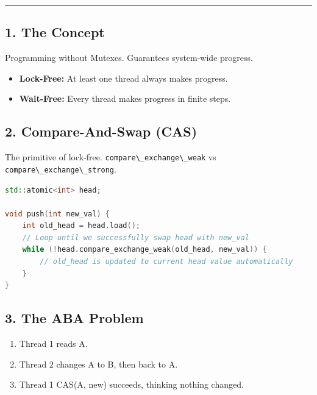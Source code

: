 \begin{center}\rule{0.5\linewidth}{0.5pt}\end{center}

\hypertarget{the-concept}{%
\subsection{1. The Concept}\label{the-concept}}

Programming without Mutexes. Guarantees system-wide progress.

\begin{itemize}
\tightlist
\item
  \textbf{Lock-Free:} At least one thread always makes progress.
\item
  \textbf{Wait-Free:} Every thread makes progress in finite steps.
\end{itemize}

\hypertarget{compare-and-swap-cas}{%
\subsection{2. Compare-And-Swap (CAS)}\label{compare-and-swap-cas}}

The primitive of lock-free.
\passthrough{\lstinline!compare\_exchange\_weak!} vs
\passthrough{\lstinline!compare\_exchange\_strong!}.

\begin{lstlisting}[language={C++}]
std::atomic<int> head;

void push(int new_val) {
    int old_head = head.load();
    // Loop until we successfully swap head with new_val
    while (!head.compare_exchange_weak(old_head, new_val)) {
        // old_head is updated to current head value automatically
    }
}
\end{lstlisting}

\hypertarget{the-aba-problem}{%
\subsection{3. The ABA Problem}\label{the-aba-problem}}

\begin{enumerate}
\def\labelenumi{\arabic{enumi}.}
\tightlist
\item
  Thread 1 reads A.
\item
  Thread 2 changes A to B, then back to A.
\item
  Thread 1 CAS(A, new) succeeds, thinking nothing changed.
\end{enumerate}

